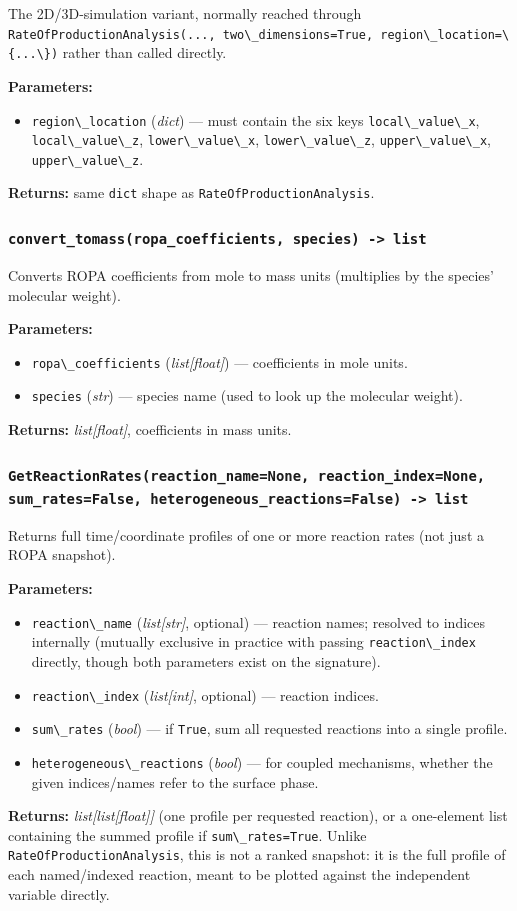 \documentclass[11pt,a4paper]{report}
\newcommand{\pymethod}[1]{\subsubsection{\texttt{#1}}}
\newcommand{\returns}{\vspace{2mm}\noindent\textbf{Returns:} }
\newenvironment{params}{\vspace{1mm}\noindent\textbf{Parameters:}\begin{itemize}[leftmargin=1.1cm,label={--},itemsep=1pt,topsep=2pt]}{\end{itemize}}
\newcommand{\pkg}[1]{\lstinline|#1|}
\begin{document}
The 2D/3D-simulation variant, normally reached through
\pkg{RateOfProductionAnalysis(..., two\_dimensions=True, region\_location=\{...\})}
rather than called directly.

\begin{params}
\item \pkg{region\_location} (\textit{dict}) --- must contain the six keys
  \pkg{local\_value\_x}, \pkg{local\_value\_z}, \pkg{lower\_value\_x},
  \pkg{lower\_value\_z}, \pkg{upper\_value\_x}, \pkg{upper\_value\_z}.
\end{params}
\returns same \pkg{dict} shape as \pkg{RateOfProductionAnalysis}.

\pymethod{convert\_tomass(ropa\_coefficients, species) -> list}

Converts ROPA coefficients from mole to mass units (multiplies by the
species' molecular weight).

\begin{params}
\item \pkg{ropa\_coefficients} (\textit{list[float]}) --- coefficients in
  mole units.
\item \pkg{species} (\textit{str}) --- species name (used to look up the
  molecular weight).
\end{params}
\returns \textit{list[float]}, coefficients in mass units.

\pymethod{GetReactionRates(reaction\_name=None, reaction\_index=None, sum\_rates=False, heterogeneous\_reactions=False) -> list}

Returns full time/coordinate profiles of one or more reaction rates (not
just a ROPA snapshot).

\begin{params}
\item \pkg{reaction\_name} (\textit{list[str]}, optional) --- reaction names;
  resolved to indices internally (mutually exclusive in practice with
  passing \pkg{reaction\_index} directly, though both parameters exist on
  the signature).
\item \pkg{reaction\_index} (\textit{list[int]}, optional) --- reaction
  indices.
\item \pkg{sum\_rates} (\textit{bool}) --- if \pkg{True}, sum all requested
  reactions into a single profile.
\item \pkg{heterogeneous\_reactions} (\textit{bool}) --- for coupled
  mechanisms, whether the given indices/names refer to the surface phase.
\end{params}
\returns \textit{list[list[float]]} (one profile per requested reaction), or
a one-element list containing the summed profile if \pkg{sum\_rates=True}.
Unlike \pkg{RateOfProductionAnalysis}, this is not a ranked snapshot: it is
the full profile of each named/indexed reaction, meant to be plotted against
the independent variable directly.
\end{document}
